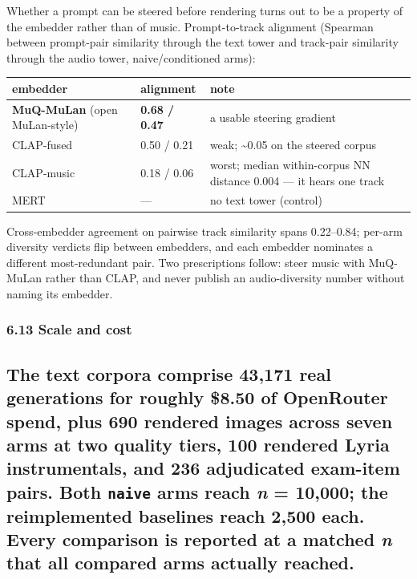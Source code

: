 \documentclass[
  11pt,
]{article}
\theoremstyle{plain}
\theoremstyle{definition}
\begin{document}
Whether a prompt can be steered before rendering turns out to be a
property of the embedder rather than of music. Prompt-to-track alignment
(Spearman between prompt-pair similarity through the text tower and
track-pair similarity through the audio tower, naive/conditioned arms):

\begin{longtable}[]{@{}lll@{}}
\toprule\noalign{}
embedder & alignment & note \\
\midrule\noalign{}
\endhead
\bottomrule\noalign{}
\endlastfoot
\textbf{MuQ-MuLan} (open MuLan-style) & \textbf{0.68 / 0.47} & a usable
steering gradient \\
CLAP-fused & 0.50 / 0.21 & weak; \textasciitilde0.05 on the steered
corpus \\
CLAP-music & 0.18 / 0.06 & worst; median within-corpus NN distance 0.004
--- it hears one track \\
MERT & --- & no text tower (control) \\
\end{longtable}

Cross-embedder agreement on pairwise track similarity spans 0.22--0.84;
per-arm diversity verdicts flip between embedders, and each embedder
nominates a different most-redundant pair. Two prescriptions follow:
steer music with MuQ-MuLan rather than CLAP, and never publish an
audio-diversity number without naming its embedder.

\subsubsection{6.13 Scale and cost}\label{613-scale-and-cost}

\subsection{\texorpdfstring{The text corpora comprise 43,171 real
generations for roughly \$8.50 of OpenRouter spend, plus 690 rendered
images across seven arms at two quality tiers, 100 rendered Lyria
instrumentals, and 236 adjudicated exam-item pairs. Both \texttt{naive}
arms reach \emph{n} = 10,000; the reimplemented baselines reach 2,500
each. Every comparison is reported at a matched \emph{n} that all
compared arms actually
reached.}{The text corpora comprise 43,171 real generations for roughly \$8.50 of OpenRouter spend, plus 690 rendered images across seven arms at two quality tiers, 100 rendered Lyria instrumentals, and 236 adjudicated exam-item pairs. Both naive arms reach n = 10,000; the reimplemented baselines reach 2,500 each. Every comparison is reported at a matched n that all compared arms actually reached.}}\label{the-text-corpora-comprise-43171-real-generations-for-roughly-850-of-openrouter-spend-plus-690-rendered-images-across-seven-arms-at-two-quality-tiers-100-rendered-lyria-instrumentals-and-236-adjudicated-exam-item-pairs-both-naive-arms-reach-n--10000-the-reimplemented-baselines-reach-2500-each-every-comparison-is-reported-at-a-matched-n-that-all-compared-arms-actually-reached}
\end{document}
